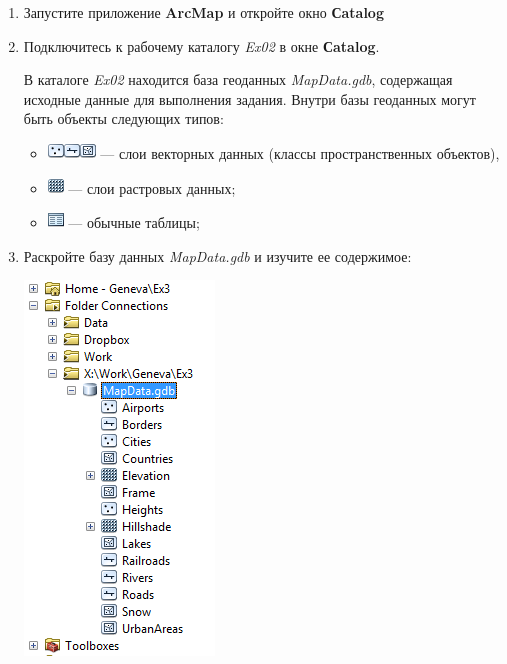 \documentclass[]{book}
\providecommand{\tightlist}{%
  \setlength{\itemsep}{0pt}\setlength{\parskip}{0pt}}
\theoremstyle{definition}
\theoremstyle{definition}
\theoremstyle{definition}
\theoremstyle{remark}
\begin{document}
\begin{enumerate}
\def\labelenumi{\arabic{enumi}.}
\item
  Запустите приложение \textbf{ArcMap} и откройте окно \textbf{Сatalog}
\item
  Подключитесь к рабочему каталогу \emph{Ex02} в окне \textbf{Сatalog}.

  В каталоге \emph{Ex02} находится база геоданных \emph{MapData.gdb},
  содержащая исходные данные для выполнения задания. Внутри базы
  геоданных могут быть объекты следующих типов:

  \begin{itemize}
  \tightlist
  \item
    \includegraphics{images/Ex02/image5.png}\includegraphics{images/Ex02/image6.png}\includegraphics{images/Ex02/image7.png}
    --- слои векторных данных (классы пространственных объектов),
  \item
    \includegraphics{images/Ex02/image8.png} --- слои растровых данных;
  \item
    \includegraphics{images/Ex02/image9.png} --- обычные таблицы;
  \end{itemize}
\item
  Раскройте базу данных \emph{MapData.gdb} и изучите ее содержимое:

  \includegraphics{images/Ex02/image10.png}
\end{enumerate}
\end{document}

